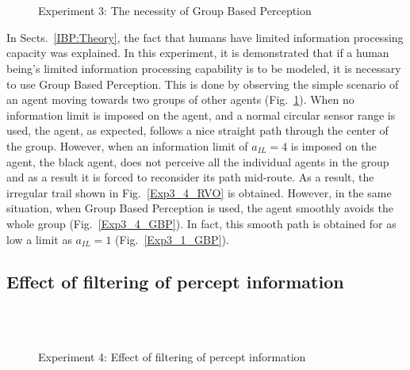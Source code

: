 \begin{figure}[!t]
  \centering
   \\
    \hspace{1pt}
  \\
  \hspace{1pt}
  \caption{Experiment 3: The necessity of Group Based Perception}
  \label{Exp3}
\end{figure}

In Sects.~\ref{IBP:Theory}, the fact that humans have limited information processing capacity was explained. In this experiment, it is demonstrated that if a human being's limited information processing capability is to be modeled, it is necessary to use Group Based Perception. This is done by observing the simple scenario of an agent moving towards two groups of other agents (Fig.~\ref{Exp3}). When no information limit is imposed on the agent, and a normal circular sensor range is used, the agent, as expected, follows a nice straight path through the center of the group. However, when an information limit of $a_{IL} = 4$ is imposed on the agent, the black agent, does not perceive all the individual agents in the group and  as a result it is forced to reconsider its path mid-route. As a result, the irregular trail shown in Fig.~\ref{Exp3_4_RVO} is obtained. However, in the same situation, when Group Based Perception is used, the agent smoothly avoids the whole group (Fig.~\ref{Exp3_4_GBP}). In fact, this smooth path is obtained for as low a limit as $a_{IL} = 1$ (Fig.~\ref{Exp3_1_GBP}).  

\subsection{Effect of filtering of percept information}

\begin{figure}[!tb]
  \centering
   \\
  \hspace{1pt}
  \\
  \hspace{1pt}
  \caption{Experiment 4: Effect of filtering of percept information}
  \label{Exp4}
\end{figure}

